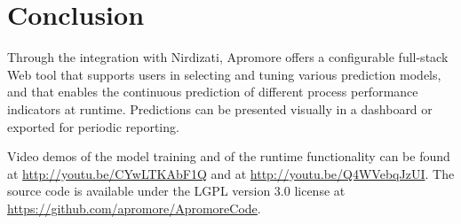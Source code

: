 \documentclass[runningheads,a4paper]{llncs}
\begin{document}
\section{Conclusion} \label{sec:conclusion}
Through the integration with Nirdizati, Apromore offers a configurable full-stack Web tool that supports users in selecting and tuning various prediction models, and that enables the continuous prediction of different process performance indicators at runtime. Predictions can be presented visually in a dashboard or exported for periodic reporting.

Video demos of the model training and of the runtime functionality can be found at \url{http://youtu.be/CYwLTKAbF1Q} and at \url{http://youtu.be/Q4WVebqJzUI}. The source code is available under the LGPL version 3.0 license at \url{https://github.com/apromore/ApromoreCode}.


\end{document}

